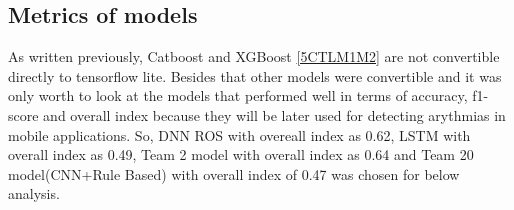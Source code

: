 \subsection{Metrics of models}

As written previously, Catboost and XGBoost \ref{5CTLM1M2} are not convertible directly to tensorflow lite. Besides that other models were convertible and it was only worth to look at the models that performed well in terms of accuracy, f1-score and overall index because they will be later used for detecting arythmias in mobile applications. So, DNN ROS with overeall index as 0.62, LSTM with overall index as 0.49, Team 2 model with overall index as 0.64 and Team 20 model(CNN+Rule Based) with overall index of 0.47 was chosen for below analysis. 


\begin{figure}[H]
\\

\end{figure}
